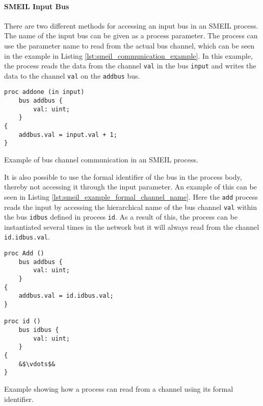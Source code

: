 \paragraph{SMEIL Input Bus}
There are two different methods for accessing an input bus in an SMEIL process. The name of the input bus can be given as a process parameter. The process can use the parameter name to read from the actual bus channel, which can be seen in the example in Listing \ref{lst:smeil_communication_example}. In this example, the process reads the data from the channel \texttt{val} in the bus \texttt{input} and writes the data to the channel \texttt{val} on the \texttt{addbus} bus.
\begin{listing}
\begin{verbatim}
proc addone (in input)
    bus addbus {
        val: uint;
    }
{
    addbus.val = input.val + 1;
}
\end{verbatim}
\caption{Example of bus channel communication in an SMEIL process.}
\label{lst:smeil_communication_example}
\end{listing}

It is also possible to use the formal identifier of the bus in the process body, thereby not accessing it through the input parameter. An example of this can be seen in Listing \ref{lst:smeil_example_formal_channel_name}. Here the \texttt{add} process reads the input by accessing the hierarchical name of the bus channel \texttt{val} within the bus \texttt{idbus} defined in process \texttt{id}. As a result of this, the process can be instantiated several times in the network but it will always read from the channel \texttt{id.idbus.val}.
\begin{listing}
\begin{verbatim}
proc Add ()
    bus addbus {
        val: uint;
    }
{
    addbus.val = id.idbus.val;
}

proc id ()
    bus idbus {
        val: uint;
    }
{
    &$\vdots$&
}
\end{verbatim}
\caption{Example showing how a process can read from a channel using its formal identifier.}
\label{lst:smeil_example_formal_channel_name}
\end{listing}
